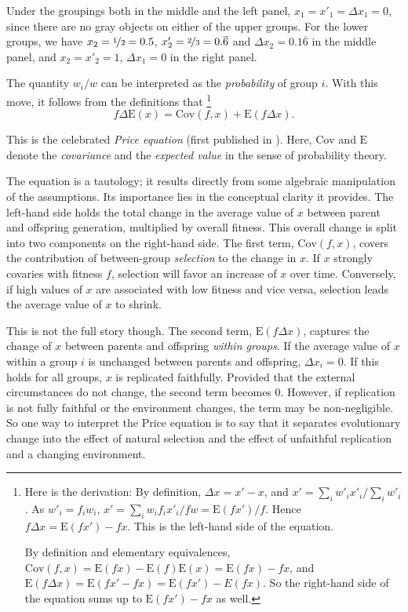 \documentclass[output=paper,hidelinks]{langscibook}
\begin{document}
Under the groupings both in the middle and the left panel, $x_1 = x'_1 = \Delta x_1 = 0$,
since there are no gray objects on either of the upper groups. For the lower groups, we
have $x_2=\nicefrac{1}{2}=0.5$, $x'_2=\nicefrac{2}{3}=0.\overline{6}$ and
$\Delta x_2 = 0.1\overline{6}$ in the middle panel, and $x_2 = x'_2=1$, $\Delta x_1=0$ in
the right panel.

The quantity $w_i/w$ can be interpreted as the \emph{probability} of group
$i$. With this move, it follows from the definitions that%
\footnote{Here is the derivation: By definition, $\Delta x = x'-x$, and
  $x' = \sum_i w'_i x'_i/\sum_i w'_i$. As $w'_i = f_i w_i$,
  $x' = \sum_i w_i f_i x'_i/fw = \mathrm{E}(fx')/f$. Hence
  $f\Delta x = \textrm{E}(fx') - fx$. This is the left-hand side of the equation.

  By definition and elementary equivalences,
  $\mathrm{Cov}(f, x) = \mathrm{E}(fx) - \mathrm{E}(f)\mathrm{E}(x) = \mathrm{E}(fx) -
  fx$, and $\mathrm{E}(f\Delta x) = \mathrm{E}(fx' - fx) = \mathrm{E}(fx') - E(fx)$. So
  the right-hand side of the equation sums up to $\mathrm{E}(fx') - fx$ as well.%
}
\begin{equation}
f\Delta \mathrm{E}(x) = \mathrm{Cov}(f, x) + \mathrm{E}(f\Delta x).\label{eq:1}
\end{equation}


This is the celebrated \emph{Price equation} (first published in \citealt{price70}). Here,
$\mathrm{Cov}$ and $\mathrm{E}$ denote the \emph{covariance} and the \emph{expected value}
in the sense of probability theory.

The equation is a tautology; it results directly from some algebraic manipulation of the
assumptions. Its importance lies in the conceptual clarity it provides. The left-hand side
holds the total change in the average value of $x$ between parent and offspring
generation, multiplied by overall fitness. This overall change is split into two
components on the right-hand side. The first term, $\mathrm{Cov}(f, x)$, covers the
contribution of between-group \emph{selection} to the change in $x$. If $x$ strongly
covaries with fitness $f$, selection will favor an increase of $x$ over time. Conversely,
if high values of $x$ are associated with low fitness and vice versa, selection leads the
average value of $x$ to shrink.

This is not the full story though. The second term, $\mathrm{E}(f\Delta x)$, captures the
change of $x$ between parents and offspring \emph{within groups}. If the average value of
$x$ within a group $i$ is unchanged between parents and offspring, $\Delta x_i = 0$. If
this holds for all groups, $x$ is replicated faithfully. Provided that the external
circumstances do not change, the second term becomes 0. However, if replication is not
fully faithful or the environment changes, the term may be non-negligible. So one way to
interpret the Price equation is to say that it separates evolutionary change into the
effect of natural selection and the effect of unfaithful replication and a changing
environment.
\end{document}
